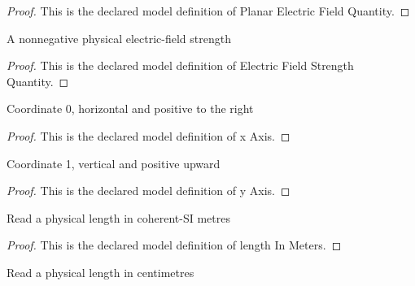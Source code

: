 \begin{proof}
  This is the declared model definition of Planar Electric Field Quantity.
\end{proof}
\begin{definition}
  \label{def:physics:phyx-mini-0831:phyxminiproblems-problemphyxmini0831-electricfieldstrengthquantity}
  A nonnegative physical electric-field strength
\end{definition}
\begin{proof}
  This is the declared model definition of Electric Field Strength Quantity.
\end{proof}
\begin{definition}[x Axis]
  \label{def:physics:phyx-mini-0831:phyxminiproblems-problemphyxmini0831-xaxis}
  Coordinate 0, horizontal and positive to the right
\end{definition}
\begin{proof}
  This is the declared model definition of x Axis.
\end{proof}
\begin{definition}[y Axis]
  \label{def:physics:phyx-mini-0831:phyxminiproblems-problemphyxmini0831-yaxis}
  Coordinate 1, vertical and positive upward
\end{definition}
\begin{proof}
  This is the declared model definition of y Axis.
\end{proof}
\begin{definition}
  \label{def:physics:phyx-mini-0831:phyxminiproblems-problemphyxmini0831-lengthinmeters}
  Read a physical length in coherent-SI metres
\end{definition}
\begin{proof}
  This is the declared model definition of length In Meters.
\end{proof}
\begin{definition}
  \label{def:physics:phyx-mini-0831:phyxminiproblems-problemphyxmini0831-lengthincentimeters}
  Read a physical length in centimetres
\end{definition}
